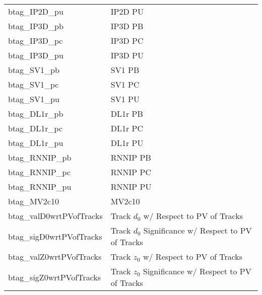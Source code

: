 {\begin{columns}
\begin{column}{0.5\textwidth}
{\begin{tabular}{ |l|l| }
                btag\_IP2D\_pu&IP2D PU \\
                btag\_IP3D\_pb&IP3D PB \\
                btag\_IP3D\_pc&IP3D PC \\
                btag\_IP3D\_pu&IP3D PU \\
                btag\_SV1\_pb&SV1 PB \\
                btag\_SV1\_pc&SV1 PC \\
                btag\_SV1\_pu&SV1 PU \\
                btag\_DL1r\_pb&DL1r PB \\
                btag\_DL1r\_pc&DL1r PC \\
                btag\_DL1r\_pu&DL1r PU \\
                btag\_RNNIP\_pb&RNNIP PB \\
                btag\_RNNIP\_pc&RNNIP PC \\
                btag\_RNNIP\_pu&RNNIP PU \\
                btag\_MV2c10&MV2c10 \\
                btag\_valD0wrtPVofTracks&Track $d_0$ w/ Respect to PV of Tracks \\
                btag\_sigD0wrtPVofTracks&Track $d_0$ Significance w/ Respect to PV of Tracks \\
                btag\_valZ0wrtPVofTracks&Track $z_0$ w/ Respect to PV of Tracks \\
                btag\_sigZ0wrtPVofTracks&Track $z_0$ Significance w/ Respect to PV of Tracks \\
                \hline
            \end{tabular}}
        \end{column}
    \end{columns}
}
